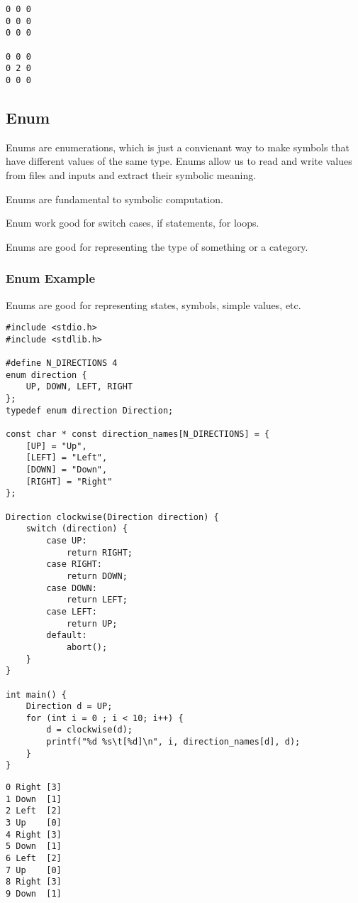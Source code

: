 \documentclass[11pt]{article}
\begin{document}
\begin{verbatim}
0 0 0 
0 0 0 
0 0 0 

0 0 0 
0 2 0 
0 0 0
\end{verbatim}

\subsection{Enum}
\label{sec:org807d889}

Enums are enumerations, which is just a convienant way to make symbols
that have different values of the same type. Enums allow us to read
and write values from files and inputs and extract their symbolic meaning.

Enums are fundamental to symbolic computation.

Enum work good for switch cases, if statements, for loops.

Enums are good for representing the type of something or a category.

\subsubsection{Enum Example}
\label{sec:org4bcb964}

Enums are good for representing states, symbols, simple values, etc.

\begin{verbatim}
#include <stdio.h>
#include <stdlib.h>

#define N_DIRECTIONS 4
enum direction {
    UP, DOWN, LEFT, RIGHT
};
typedef enum direction Direction;

const char * const direction_names[N_DIRECTIONS] = {
    [UP] = "Up",
    [LEFT] = "Left",
    [DOWN] = "Down",
    [RIGHT] = "Right"
};

Direction clockwise(Direction direction) {
    switch (direction) {
        case UP:
            return RIGHT;
        case RIGHT:
            return DOWN;
        case DOWN:
            return LEFT;
        case LEFT:
            return UP;
        default:
            abort();
    }
}

int main() {
    Direction d = UP;
    for (int i = 0 ; i < 10; i++) {
        d = clockwise(d);
        printf("%d %s\t[%d]\n", i, direction_names[d], d);
    }
}
\end{verbatim}

\begin{verbatim}
0 Right	[3]
1 Down	[1]
2 Left	[2]
3 Up	[0]
4 Right	[3]
5 Down	[1]
6 Left	[2]
7 Up	[0]
8 Right	[3]
9 Down	[1]
\end{verbatim}
\end{document}
